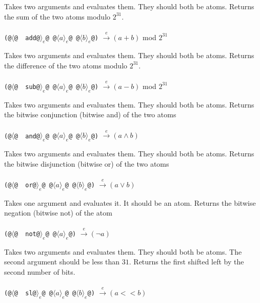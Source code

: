 \documentclass[twocolumn]{report}
\begin{document}
\begin{description}[leftmargin=1.5cm,labelwidth=1.3cm]
\item [\texttt{~~add}]
Takes two arguments and evaluates them.
They should both be atoms.
Returns the sum of the two atoms modulo $2^{31}$. \\
\\
\texttt{(@$\langle$@~~add@$\rangle_{e}$@ @$\langle a \rangle_{e}$@ @$\langle b \rangle_{e}$@)} $\xrightarrow{e} (a + b)$ mod $2^{31}$

\item [\texttt{~~sub}]
Takes two arguments and evaluates them.
They should both be atoms.
Returns the difference of the two atoms modulo $2^{31}$. \\
\\
\texttt{(@$\langle$@~~sub@$\rangle_{e}$@ @$\langle a \rangle_{e}$@ @$\langle b \rangle_{e}$@)} $\xrightarrow{e} (a - b)$ mod $2^{31}$

\item [\texttt{~~and}]
Takes two arguments and evaluates them.
They should both be atoms.
Returns the bitwise conjunction (bitwise and) of the two atoms \\
\\
\texttt{(@$\langle$@~~and@$\rangle_{e}$@ @$\langle a \rangle_{e}$@ @$\langle b \rangle_{e}$@)} $\xrightarrow{e} (a \land b)$

\item [\texttt{~~or}]
Takes two arguments and evaluates them.
They should both be atoms.
Returns the bitwise disjunction (bitwise or) of the two atoms \\
\\
\texttt{(@$\langle$@~~or@$\rangle_{e}$@ @$\langle a \rangle_{e}$@ @$\langle b \rangle_{e}$@)} $\xrightarrow{e} (a \lor b)$

\item [\texttt{~~not}]
Takes one argument and evaluates it.
It should be an atom.
Returns the bitwise negation (bitwise not) of the atom \\
\\
\texttt{(@$\langle$@~~not@$\rangle_{e}$@ @$\langle a \rangle_{e}$@)} $\xrightarrow{e} (\neg a)$

\item [\texttt{~~sl}]
Takes two arguments and evaluates them.
They should both be atoms.
The second argument should be less than $31$.
Returns the first shifted left by the second number of bits. \\
\\
\texttt{(@$\langle$@~~sl@$\rangle_{e}$@ @$\langle a \rangle_{e}$@ @$\langle b \rangle_{e}$@)} $\xrightarrow{e} (a << b)$


\end{description}
\end{document}

